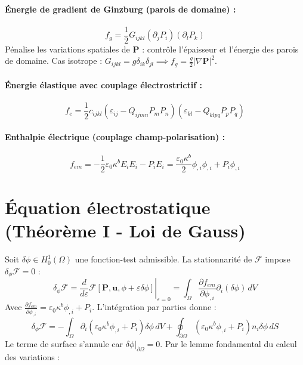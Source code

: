 \documentclass[11pt, a4paper]{article}
\begin{document}
\paragraph{Énergie de gradient de Ginzburg (parois de domaine) :}
\begin{equation}
f_g = \frac{1}{2} G_{ijkl} (\partial_j P_i) (\partial_l P_k)
\end{equation}
Pénalise les variations spatiales de $\mathbf{P}$ : contrôle l'épaisseur et l'énergie des parois de domaine. Cas isotrope : $G_{ijkl} = g\delta_{ik}\delta_{jl} \implies f_g = \frac{g}{2}|\nabla\mathbf{P}|^2$.

\paragraph{Énergie élastique avec couplage électrostrictif :}
\begin{equation}
f_e = \frac{1}{2} c_{ijkl} \left(\varepsilon_{ij} - Q_{ijmn}P_mP_n\right) \left(\varepsilon_{kl} - Q_{klpq}P_pP_q\right)
\end{equation}

\paragraph{Enthalpie électrique (couplage champ-polarisation) :}
\begin{equation}
f_{em} = -\frac{1}{2}\varepsilon_0\kappa^b E_i E_i - P_i E_i = \frac{\varepsilon_0\kappa^b}{2}\phi_{,i}\phi_{,i} + P_i\phi_{,i}
\end{equation}

\section{Équation électrostatique (Théorème I - Loi de Gauss)}

Soit $\delta\phi \in H^1_0(\Omega)$ une fonction-test admissible. La stationnarité de $\mathcal{F}$ impose $\delta_\phi\mathcal{F} = 0$ :
\begin{equation}
\delta_\phi\mathcal{F} = \left.\frac{d}{d\varepsilon}\mathcal{F}[\mathbf{P},\mathbf{u},\phi+\varepsilon\delta\phi]\right|_{\varepsilon=0} = \int_\Omega \frac{\partial f_{em}}{\partial \phi_{,i}} \partial_i(\delta\phi) \, dV
\end{equation}
Avec $\frac{\partial f_{em}}{\partial \phi_{,i}} = \varepsilon_0\kappa^b\phi_{,i} + P_i$. L'intégration par parties donne :
\begin{equation}
\delta_\phi\mathcal{F} = -\int_\Omega \partial_i \left(\varepsilon_0\kappa^b\phi_{,i} + P_i\right)\delta\phi \, dV + \oint_{\partial\Omega} \left(\varepsilon_0\kappa^b\phi_{,i}+P_i\right)n_i \delta\phi \, dS
\end{equation}
Le terme de surface s'annule car $\delta\phi\big|_{\partial\Omega} = 0$. Par le lemme fondamental du calcul des variations :
\end{document}
